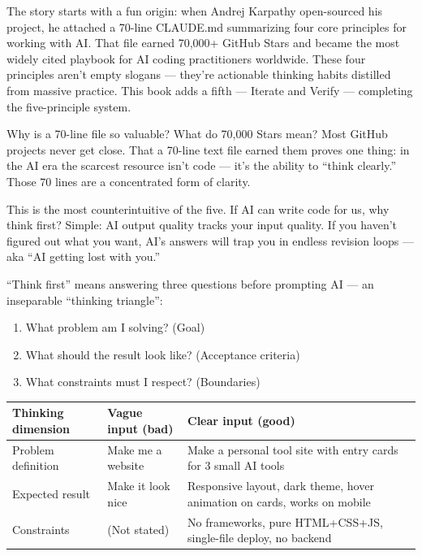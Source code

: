 

The story starts with a fun origin: when Andrej Karpathy open-sourced his project, he attached a 70-line CLAUDE.md summarizing four core principles for working with AI. That file earned 70,000+ GitHub Stars and became the most widely cited playbook for AI coding practitioners worldwide. These four principles aren't empty slogans — they're actionable thinking habits distilled from massive practice. This book adds a fifth — Iterate and Verify — completing the five-principle system.

\begin{tcbinfo}{Why is a 70-line file so valuable?}
What do 70,000 Stars mean? Most GitHub projects never get close. That a 70-line text file earned them proves one thing: in the AI era the scarcest resource isn't code — it's the ability to “think clearly.” Those 70 lines are a concentrated form of clarity.

\end{tcbinfo}


This is the most counterintuitive of the five. If AI can write code for us, why think first? Simple: AI output quality tracks your input quality. If you haven't figured out what you want, AI's answers will trap you in endless revision loops — aka “AI getting lost with you.”

“Think first” means answering three questions before prompting AI — an inseparable “thinking triangle”:

\begin{enumerate}
  \item What problem am I solving? (Goal)
  \item What should the result look like? (Acceptance criteria)
  \item What constraints must I respect? (Boundaries)
\end{enumerate}

\begin{center}
\begin{tabularx}{\linewidth}{|X|X|X|}
\hline
\textbf{Thinking dimension} & \textbf{Vague input (bad)} & \textbf{Clear input (good)} \tabularnewline
\hline
Problem definition & Make me a website & Make a personal tool site with entry cards for 3 small AI tools \tabularnewline
Expected result & Make it look nice & Responsive layout, dark theme, hover animation on cards, works on mobile \tabularnewline
Constraints & (Not stated) & No frameworks, pure HTML+CSS+JS, single-file deploy, no backend \tabularnewline
\hline
\end{tabularx}
\end{center}

